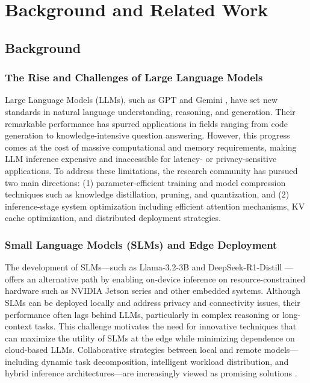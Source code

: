 \chapter{Background and Related Work}
\label{chapter:background}

\section{Background}
\subsection{The Rise and Challenges of Large Language Models}
Large Language Models (LLMs), such as GPT and Gemini \cite{Vaswani2017Attention}, have set new standards in natural language understanding, reasoning, and generation. Their remarkable performance has spurred applications in fields ranging from code generation to knowledge-intensive question answering. However, this progress comes at the cost of massive computational and memory requirements, making LLM inference expensive and inaccessible for latency- or privacy-sensitive applications. To address these limitations, the research community has pursued two main directions: (1) parameter-efficient training and model compression techniques such as knowledge distillation, pruning, and quantization, and (2) inference-stage system optimization including efficient attention mechanisms, KV cache optimization, and distributed deployment strategies.

\subsection{Small Language Models (SLMs) and Edge Deployment}
The development of SLMs—such as Llama-3.2-3B \cite{Touvron2023LLaMA} and DeepSeek-R1-Distill \cite{DeepSeek-RL}—offers an alternative path by enabling on-device inference on resource-constrained hardware such as NVIDIA Jetson series and other embedded systems. Although SLMs can be deployed locally and address privacy and connectivity issues, their performance often lags behind LLMs, particularly in complex reasoning or long-context tasks. This challenge motivates the need for innovative techniques that can maximize the utility of SLMs at the edge while minimizing dependence on cloud-based LLMs. Collaborative strategies between local and remote models—including dynamic task decomposition, intelligent workload distribution, and hybrid inference architectures—are increasingly viewed as promising solutions \cite{Narayan2025Minions}.

